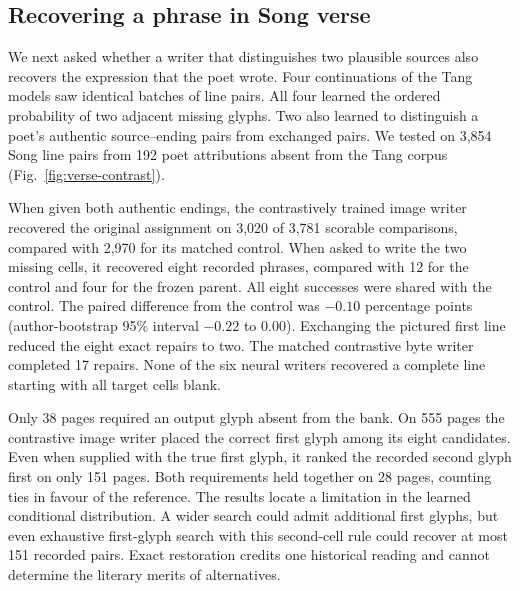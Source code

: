 \subsection*{Recovering a phrase in Song verse}
We next asked whether a writer that distinguishes two plausible sources also recovers the expression that the poet wrote. Four continuations of the Tang models saw identical batches of line pairs. All four learned the ordered probability of two adjacent missing glyphs. Two also learned to distinguish a poet's authentic source--ending pairs from exchanged pairs. We tested on 3,854 Song line pairs from 192 poet attributions absent from the Tang corpus (Fig.~\ref{fig:verse-contrast}).

When given both authentic endings, the contrastively trained image writer recovered the original assignment on 3,020 of 3,781 scorable comparisons, compared with 2,970 for its matched control. When asked to write the two missing cells, it recovered eight recorded phrases, compared with 12 for the control and four for the frozen parent. All eight successes were shared with the control. The paired difference from the control was $-0.10$ percentage points (author-bootstrap 95\% interval $-0.22$ to $0.00$). Exchanging the pictured first line reduced the eight exact repairs to two. The matched contrastive byte writer completed 17 repairs. None of the six neural writers recovered a complete line starting with all target cells blank.

Only 38 pages required an output glyph absent from the bank. On 555 pages the contrastive image writer placed the correct first glyph among its eight candidates. Even when supplied with the true first glyph, it ranked the recorded second glyph first on only 151 pages. Both requirements held together on 28 pages, counting ties in favour of the reference. The results locate a limitation in the learned conditional distribution. A wider search could admit additional first glyphs, but even exhaustive first-glyph search with this second-cell rule could recover at most 151 recorded pairs. Exact restoration credits one historical reading and cannot determine the literary merits of alternatives.
